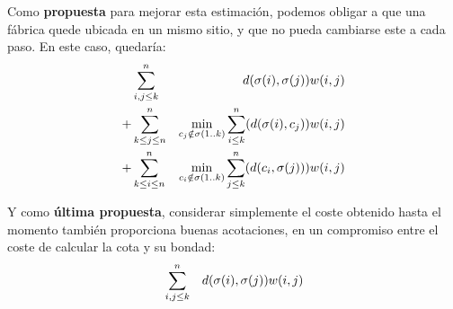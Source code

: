 \documentclass[a4paper, 11pt]{article} %
\begin{document}
      Como \textbf{propuesta} para mejorar esta estimación, podemos obligar a que una fábrica quede ubicada en un mismo sitio,
      y que no pueda cambiarse este a cada paso. En este caso, quedaría:
      \begin{eqnarray*}
      \displaystyle
	  & \sum_{i,j \leq k}^n & d(\sigma(i),\sigma(j)) w(i,j) \\
	+ & \sum_{k\leq j \leq n}^n & \min_{c_j \notin \sigma(1..k)}{\sum^n_{i\leq k} (d(\sigma(i),c_j))} w(i,j) \\
	+ & \sum_{k\leq i \leq n}^n & \min_{c_i \notin \sigma(1..k)}{\sum^n_{j\leq k} (d(c_i, \sigma(j)))} w(i,j) \\
      \end{eqnarray*}

      
      Y como \textbf{última propuesta}, considerar simplemente el coste obtenido hasta el momento también proporciona
      buenas acotaciones, en un compromiso entre el coste de calcular la cota y su bondad:
      \begin{eqnarray*}
      \displaystyle
	  & \sum_{i,j \leq k}^n & d(\sigma(i),\sigma(j)) w(i,j)
      \end{eqnarray*}
      
\end{document}
